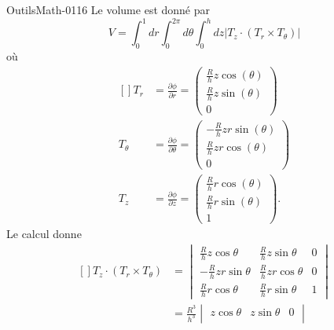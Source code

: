 \begin{corrige}{OutilsMath-0116}
    Le volume est donné par
    \begin{equation}
        V=\int_0^1dr\int_0^{2\pi}d\theta\int_0^hdz| T_z\cdot(T_r\times T_{\theta}) |
    \end{equation}
    où
    \begin{equation}
        \begin{aligned}[]
            T_r&=\frac{ \partial \phi }{ \partial r }=\begin{pmatrix}
                \frac{ R }{ h }z\cos(\theta)    \\ 
                \frac{ R }{ h }z\sin(\theta)    \\ 
                0    
            \end{pmatrix}\\
            T_{\theta}&=\frac{ \partial \phi }{ \partial \theta }=\begin{pmatrix}
                -\frac{ R }{ h }zr\sin(\theta)    \\ 
                \frac{ R }{ h }zr\cos(\theta)    \\ 
                0    
            \end{pmatrix}\\
            T_z&=\frac{ \partial \phi }{ \partial z }=\begin{pmatrix}
                \frac{ R }{ h }r\cos(\theta)    \\ 
                \frac{ R }{ h }r\sin(\theta)    \\ 
                1    
            \end{pmatrix}.
        \end{aligned}
    \end{equation}
    Le calcul donne
    \begin{equation}
        \begin{aligned}[]
            T_z\cdot(T_r\times T_{\theta})
            &=\begin{vmatrix}
                \frac{ R }{ h }z\cos\theta    &   \frac{ R }{ h }z\sin\theta    &   0    \\
                -\frac{ R }{ h }zr\sin\theta    &   \frac{ R }{ h }zr\cos\theta    &   0    \\
                \frac{ R }{ h }r\cos\theta    &   \frac{ R }{ h }r\sin\theta    &   1    
            \end{vmatrix}\\
            &=\frac{ R^3 }{ h^3 }
            \begin{vmatrix}
                z\cos\theta    &   z\sin\theta    &   0    \\

\end{vmatrix}
\end{aligned}
\end{equation}
\end{corrige}

